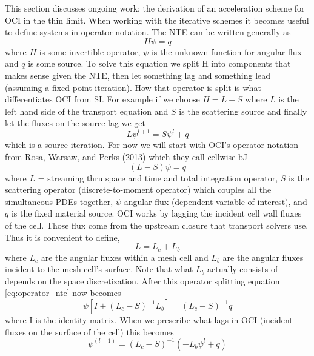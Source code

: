 This section discusses ongoing work: the derivation of an acceleration scheme for OCI in the thin limit.
When working with the iterative schemes it becomes useful to define systems in operator notation.
The NTE can be written generally as
\begin{equation}
    H\psi = q
\end{equation}
where $H$ is some invertible operator, $\psi$ is the unknown function for angular flux and $q$ is some source.
To solve this equation we split H into components that makes sense given the NTE, then let something lag and something lead (assuming a fixed point iteration).
How that operator is split is what differentiates OCI from SI.
For example if we choose $H = L-S$ where $L$ is the left hand side of the transport equation and $S$ is the scattering source and finally let the fluxes on the source lag we get
\begin{equation}
    L\psi^{l+1} = S\psi^l + q
\end{equation}
which is a source iteration.
For now we will start with OCI's operator notation from Rosa, Warsaw, and Perks (2013) \cite{rosa_cellwise_2013} which they call cellwise-bJ
\begin{equation}
    \label{eq:operator_nte}
    (L-S)\psi = q
\end{equation}
where $L$ = streaming thru space and time and total integration operator, %
$S$ is the scattering operator (discrete-to-moment operator) which couples all the simultaneous PDEs together, %
$\psi$ angular flux (dependent variable of interest), and
$q$ is the fixed material source.
OCI works by lagging the incident cell wall fluxes of the cell.
Those flux come from the upstream closure that transport solvers use.
Thus it is convenient to define,
\begin{equation}
    L = L_c + L_b
\end{equation}
where $L_c$ are the angular fluxes within a mesh cell and $L_b$ are the angular fluxes incident to the mesh cell's surface.
Note that what $L_b$ actually consists of depends on the space discretization.
After this operator splitting equation \ref{eq:operator_nte} now becomes
\begin{equation}
    \psi[I+(L_c-S)^{-1}L_b] = (L_c-S)^{-1}q
\end{equation}
where I is the identity matrix.
When we prescribe what lags in OCI (incident fluxes on the surface of the cell) this becomes
\begin{equation}
    \label{eq:itter}
    \psi^{(l+1)} = (L_c-S)^{-1}(-L_b\psi^l+q)
\end{equation}


